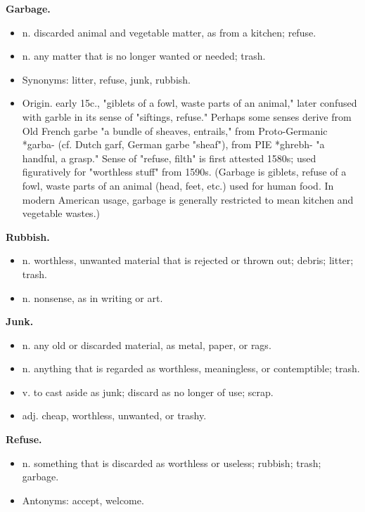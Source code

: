 \noindent\textbf{Garbage.}
\begin{itemize}
\item n. discarded animal and vegetable matter, as from a kitchen; refuse.
\item n. any matter that is no longer wanted or needed; trash.
\item Synonyms: litter, refuse, junk, rubbish.
\item Origin. early 15c., "giblets of a fowl, waste parts of an animal," later confused with garble in its sense of "siftings, refuse." Perhaps some senses derive from Old French garbe "a bundle of sheaves, entrails," from Proto-Germanic *garba- (cf. Dutch garf, German garbe "sheaf"), from PIE *ghrebh- "a handful, a grasp." Sense of "refuse, filth" is first attested 1580s; used figuratively for "worthless stuff" from 1590s. (Garbage is giblets, refuse of a fowl, waste parts of an animal (head, feet, etc.) used for human food. In modern American usage, garbage is generally restricted to mean kitchen and vegetable wastes.)
\end{itemize}

\noindent\textbf{Rubbish.}
\begin{itemize}
\item n. worthless, unwanted material that is rejected or thrown out; debris; litter; trash.
\item n. nonsense, as in writing or art.
\end{itemize}

\noindent\textbf{Junk.}
\begin{itemize}
\item n. any old or discarded material, as metal, paper, or rags.
\item n. anything that is regarded as worthless, meaningless, or contemptible; trash.
\item v. to cast aside as junk; discard as no longer of use; scrap.
\item adj. cheap, worthless, unwanted, or trashy.
\end{itemize}

\noindent\textbf{Refuse.}
\begin{itemize}
\item n. something that is discarded as worthless or useless; rubbish; trash; garbage.
\item Antonyms: accept, welcome.
\end{itemize}
